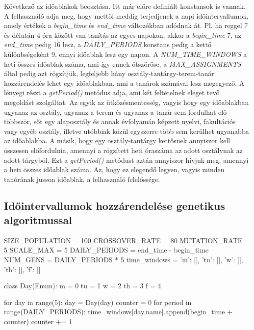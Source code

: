Következő az időablakok beosztása. Itt már előre definiált konstansok is vannak. A felhasználó adja meg, hogy mettől meddig terjedjenek a napi időintervallumok, amely értékek a \textit{begin\_time} és \textit{end\_time} változókban adódnak át. Pl. ha reggel 7 és délután 4 óra között van tanítás az egyes napokon, akkor a \textit{begin\_time} 7, az \textit{end\_time} pedig 16 lesz, a \textit{DAILY\_PERIODS} konstans pedig a kettő különbségeként 9, ennyi időablak lesz egy napon. A \textit{NUM\_TIME\_WINDOWS} a heti összes időablak száma, ami így ennek ötszöröse, a \textit{MAX\_ASSIGNMENTS} által pedig azt rögzítjük, legfeljebb hány osztály-tantárgy-terem-tanár hozzárendelés lehet egy időablakban, ami a tanárok számával lesz megegyező. A lényegi részt a \textit{getPeriod()} metódus adja, ami két feltételnek eleget tevő megoldást szolgáltat. Az egyik az ütközésmentesség, vagyis hogy egy időablakban ugyanaz az osztály, ugyanaz a terem és ugyanaz a tanár sem fordulhat elő többször, sőt egy alaposztály és annak évfolyamán képzett nyelvi, fakultációs vagy egyéb osztály, illetve utóbbiak közül egyszerre több sem kerülhet ugyanabba az időablakba. A másik, hogy egy osztály-tantárgy kettősnek annyiszor kell összesen előfordulnia, amennyi a rögzített heti óraszáma az adott osztálynak az adott tárgyból. Ezt a \textit{getPeriod()} metódust aztán annyiszor hívjuk meg, amennyi a heti összes időablak száma. Az, hogy ez elegendő legyen, vagyis minden tanórának jusson időablak, a felhasználó felelőssége.

\subsection{Időintervallumok hozzárendelése genetikus algoritmussal}

\begin{python}
SIZE_POPULATION = 100
CROSSOVER_RATE = 80
MUTATION_RATE = 5
SCALE_MAX = 5
DAILY_PERIODS = end_time - begin_time
NUM_GENS = DAILY_PERIODS * 5
time_windows = {'m': [], 'tu': [], 'w': [], 'th': [], 'f': []}


class Day(Enum):
    m = 0
    tu = 1
    w = 2
    th = 3
    f = 4


for day in range(5):
    day = Day(day)
    counter = 0
    for period in range(DAILY_PERIODS):
        time_windows[day.name].append(begin_time + counter)
        counter += 1
\end{python}

